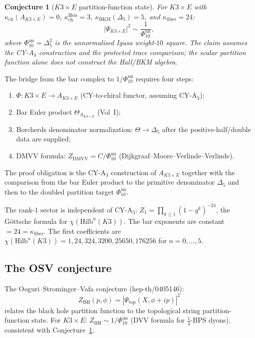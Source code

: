 \documentclass[11pt]{amsart}
\theoremstyle{plain}
\newtheorem{conjecture}[theorem]{Conjecture}
\theoremstyle{definition}
\theoremstyle{remark}
\begin{document}
\begin{conjecture}[$K3 \times E$ partition-function state]
\label{conj:k3xe-partition-function}
For $K3 \times E$ with
$\kappa_{\mathrm{ch}}(A_{K3\times E})=0$,
$\kappa_{\mathrm{ch}}^{\mathrm{Heis}} = 3$,
$\kappa_{\mathrm{BKM}}(\Delta_5) = 5$, and
$\kappa_{\mathrm{fiber}} = 24$:
\[
 |\Psi_{K3 \times E}|^2 \sim \frac{1}{\Phi_{10}^{\mathrm{un}}},
\]
where $\Phi_{10}^{\mathrm{un}}=\Delta_5^2$ is the unnormalised Igusa
weight-$10$ square. The claim assumes the CY-A$_3$ construction and the
protected trace comparison; the scalar partition function alone does not
construct the Hall/BKM algebra.
\end{conjecture}

The bridge from the bar complex to $1/\Phi_{10}^{\mathrm{un}}$ requires
four steps:
\begin{enumerate}[label=(\roman*)]
 \item $\Phi\colon K3 \times E \to A_{K3 \times E}$
       (CY-to-chiral functor, assuming CY-A$_3$);
 \item Bar Euler product $\Theta_{A_{K3 \times E}}$ (Vol~I);
 \item Borcherds denominator normalization:
       $\Theta \to \Delta_5$ after the positive-half/double data are
       supplied;
 \item DMVV formula: $Z_{\mathrm{DMVV}} = C / \Phi_{10}^{\mathrm{un}}$
       (Dijkgraaf--Moore--Verlinde--Verlinde).
\end{enumerate}
The proof obligation is the CY-A$_3$ construction of $A_{K3 \times E}$
together with the comparison from the bar Euler product to the primitive
denominator $\Delta_5$ and then to the doubled partition target
$\Phi_{10}^{\mathrm{un}}$.

The rank-$1$ sector is independent of CY-A$_3$:
$Z_1 = \prod_{k \geq 1} (1 - q^k)^{-24}$, the G\"ottsche formula
for $\chi(\mathrm{Hilb}^n(K3))$. The bar exponents are constant~$= 24
= \kappa_{\mathrm{fiber}}$. The first coefficients are
$\chi(\mathrm{Hilb}^n(K3))
= 1, 24, 324, 3200, 25650, 176256$ for $n = 0, \ldots, 5$.

\subsection{The OSV conjecture}
\label{sub:osv-partition-function}

The Ooguri--Strominger--Vafa conjecture (hep-th/0405146):
\begin{equation}\label{eq:osv}
 Z_{\mathrm{BH}}(p, \phi) = |\Psi_{\mathrm{top}}(X, \phi + ip)|^2
\end{equation}
relates the black hole partition function to the topological string
partition-function state. For $K3 \times E$:
$Z_{\mathrm{BH}} \sim 1/\Phi_{10}^{\mathrm{un}}$ (DVV formula for
$\frac{1}{4}$-BPS dyons), consistent with
Conjecture~\ref{conj:k3xe-partition-function}.
\end{document}
